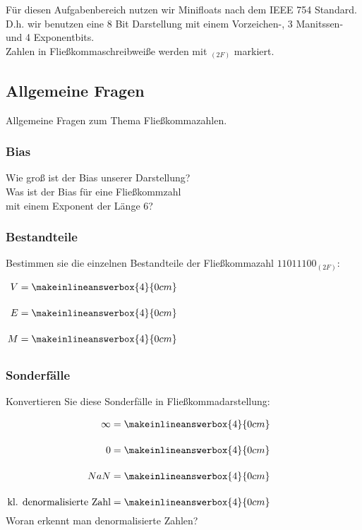 Für diesen Aufgabenbereich nutzen wir Minifloats nach dem IEEE 754 Standard.\\
D.h. wir benutzen eine 8 Bit Darstellung mit einem Vorzeichen-,  3 Manitssen- und 4 Exponentbits.\\
Zahlen in Fließkommaschreibweiße werden mit $_{(2F)}$ markiert.

\subsection{Allgemeine Fragen}
Allgemeine Fragen zum Thema Fließkommazahlen.
\subsubsection{Bias}
Wie groß ist der Bias unserer Darstellung?\\[0.3cm]
Was ist der Bias für eine Fließkommzahl\\[-0.2cm]mit einem Exponent der Länge 6? \\
\subsubsection{Bestandteile}
Bestimmen sie die einzelnen Bestandteile der Fließkommazahl $11011100_{(2F)}$:\\
\hspace*{7.9cm}$
	\arraycolsep=1.4pt\def\arraystretch{2.2}
	\begin{array}{r l}
		V = & \makeinlineanswerbox{4}{0cm}\\
		E = & \makeinlineanswerbox{4}{0cm}\\
		M = & \makeinlineanswerbox{4}{0cm}\\
	\end{array}
$
\subsubsection{Sonderfälle}
Konvertieren Sie diese Sonderfälle in Fließkommadarstellung:\\
\hspace*{4.1cm}$
	\arraycolsep=1.4pt\def\arraystretch{2.2}
	\begin{array}{r l}
		\infty = & \makeinlineanswerbox{4}{0cm}\\
		0 = & \makeinlineanswerbox{4}{0cm}\\
		NaN = & \makeinlineanswerbox{4}{0cm}\\
		\text{kl. denormalisierte Zahl} = & \makeinlineanswerbox{4}{0cm}
	\end{array}
$\\
Woran erkennt man denormalisierte Zahlen? 
